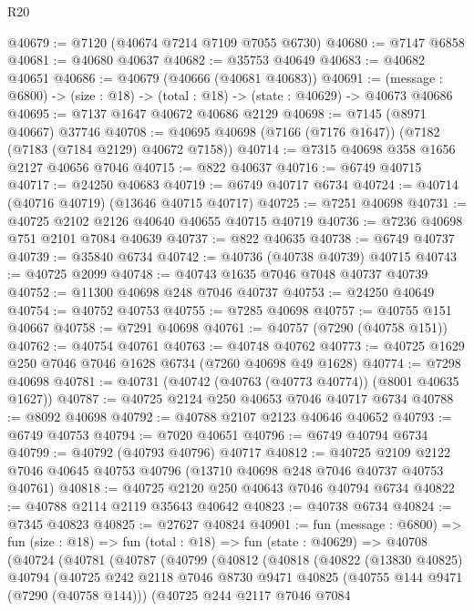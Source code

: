 \begin{lexlean}{R20}
\begin{coremodule}
{@40679 := @7120 (@40674 @7214 @7109 @7055 @6730)
@40680 := @7147 @6858
@40681 := @40680 @40637
@40682 := @35753 @40649
@40683 := @40682 @40651
@40686 := @40679 (@40666 (@40681 @40683))
@40691 := (message : @6800) -> (size : @18) -> (total : @18) -> (state : @40629) -> @40673 @40686
@40695 := @7137 @1647 @40672 @40686 @2129
@40698 := @7145 (@8971 @40667) @37746
@40708 := @40695 @40698 (@7166 (@7176 @1647)) (@7182 (@7183 (@7184 @2129) @40672 @7158))
@40714 := @7315 @40698 @358 @1656 @2127 @40656 @7046
@40715 := @822 @40637
@40716 := @6749 @40715
@40717 := @24250 @40683
@40719 := @6749 @40717 @6734
@40724 := @40714 (@40716 @40719) (@13646 @40715 @40717)
@40725 := @7251 @40698
@40731 := @40725 @2102 @2126 @40640 @40655 @40715 @40719
@40736 := @7236 @40698 @751 @2101 @7084 @40639
@40737 := @822 @40635
@40738 := @6749 @40737
@40739 := @35840 @6734
@40742 := @40736 (@40738 @40739) @40715
@40743 := @40725 @2099
@40748 := @40743 @1635 @7046 @7048 @40737 @40739
@40752 := @11300 @40698 @248 @7046 @40737
@40753 := @24250 @40649
@40754 := @40752 @40753
@40755 := @7285 @40698
@40757 := @40755 @151 @40667
@40758 := @7291 @40698
@40761 := @40757 (@7290 (@40758 @151))
@40762 := @40754 @40761
@40763 := @40748 @40762
@40773 := @40725 @1629 @250 @7046 @7046 @1628 @6734 (@7260 @40698 @49 @1628)
@40774 := @7298 @40698
@40781 := @40731 (@40742 (@40763 (@40773 @40774)) (@8001 @40635 @1627))
@40787 := @40725 @2124 @250 @40653 @7046 @40717 @6734
@40788 := @8092 @40698
@40792 := @40788 @2107 @2123 @40646 @40652
@40793 := @6749 @40753
@40794 := @7020 @40651
@40796 := @6749 @40794 @6734
@40799 := @40792 (@40793 @40796) @40717
@40812 := @40725
    @2109
    @2122
    @7046
    @40645
    @40753
    @40796
    (@13710 @40698 @248 @7046 @40737 @40753 @40761)
@40818 := @40725 @2120 @250 @40643 @7046 @40794 @6734
@40822 := @40788 @2114 @2119 @35643 @40642
@40823 := @40738 @6734
@40824 := @7345 @40823
@40825 := @27627 @40824
@40901 := fun (message : @6800) =>
  fun (size : @18) =>
  fun (total : @18) =>
  fun (state : @40629) =>
  @40708
    (@40724
      (@40781
        (@40787
          (@40799
            (@40812
              (@40818
                (@40822
                  (@13830 @40825)
                  @40794
                  (@40725
                    @242
                    @2118
                    @7046
                    @8730
                    @9471
                    @40825
                    (@40755 @144 @9471 (@7290 (@40758 @144)))
                    (@40725
                      @244
                      @2117
                      @7046
                      @7084
}
\end{coremodule}
\end{lexlean}
